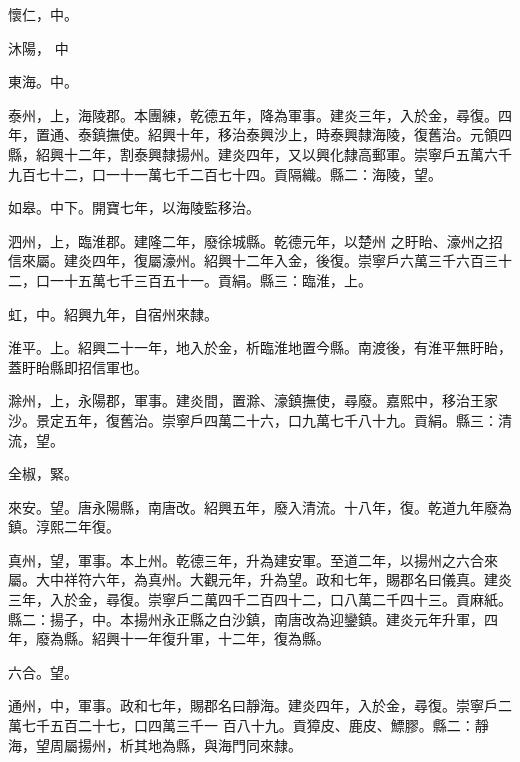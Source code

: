 \begin{pinyinscope}
 懷仁，中。



 沐陽，
 中



 東海。中。



 泰州，上，海陵郡。本團練，乾德五年，降為軍事。建炎三年，入於金，尋復。四年，置通、泰鎮撫使。紹興十年，移治泰興沙上，時泰興隸海陵，復舊治。元領四縣，紹興十二年，割泰興隸揚州。建炎四年，又以興化隸高郵軍。崇寧戶五萬六千九百七十二，口一十一萬七千二百七十四。貢隔織。縣二：海陵，望。



 如皋。中下。開寶七年，以海陵監移治。



 泗州，上，臨淮郡。建隆二年，廢徐城縣。乾德元年，以楚州
 之盱眙、濠州之招信來屬。建炎四年，復屬濠州。紹興十二年入金，後復。崇寧戶六萬三千六百三十二，口一十五萬七千三百五十一。貢絹。縣三：臨淮，上。



 虹，中。紹興九年，自宿州來隸。



 淮平。上。紹興二十一年，地入於金，析臨淮地置今縣。南渡後，有淮平無盱眙，蓋盱眙縣即招信軍也。



 滁州，上，永陽郡，軍事。建炎間，置滁、濠鎮撫使，尋廢。嘉熙中，移治王家沙。景定五年，復舊治。崇寧戶四萬二十六，口九萬七千八十九。貢絹。縣三：清流，望。



 全椒，緊。



 來安。望。唐永陽縣，南唐改。紹興五年，廢入清流。十八年，復。乾道九年廢為鎮。淳熙二年復。



 真州，望，軍事。本上州。乾德三年，升為建安軍。至道二年，以揚州之六合來屬。大中祥符六年，為真州。大觀元年，升為望。政和七年，賜郡名曰儀真。建炎三年，入於金，尋復。崇寧戶二萬四千二百四十二，口八萬二千四十三。貢麻紙。縣二：揚子，中。本揚州永正縣之白沙鎮，南唐改為迎鑾鎮。建炎元年升軍，四年，廢為縣。紹興十一年復升軍，十二年，復為縣。



 六合。望。



 通州，中，軍事。政和七年，賜郡名曰靜海。建炎四年，入於金，尋復。崇寧戶二萬七千五百二十七，口四萬三千一
 百八十九。貢獐皮、鹿皮、鰾膠。縣二：靜海，望周屬揚州，析其地為縣，與海門同來隸。




\end{pinyinscope}
